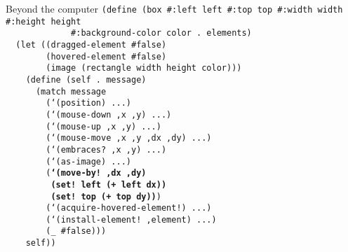 \begin{frame}{Beyond the computer}
  \tiny
  \texttt{(define (box \#:left left \#:top top \#:width width \#:height height\\
    \ \ \ \ \ \ \ \ \ \ \ \ \ \#:background-color color .\ elements)\\
    \ \ (let ((dragged-element \#false)\\
    \ \ \ \ \ \ \ \ (hovered-element \#false)\\
    \ \ \ \ \ \ \ \ (image (rectangle width height color)))\\
    \ \ \ \ (define (self .\ message)\\
    \ \ \ \ \ \ (match message\\
    \ \ \ \ \ \ \ \ (`(position) ...)\\
    \ \ \ \ \ \ \ \ (`(mouse-down ,x ,y) ...)\\
    \ \ \ \ \ \ \ \ (`(mouse-up ,x ,y) ...)\\
    \ \ \ \ \ \ \ \ (`(mouse-move ,x ,y ,dx ,dy) ...)\\
    \ \ \ \ \ \ \ \ (`(embraces?\ ,x ,y) ...)\\
    \ \ \ \ \ \ \ \ (`(as-image) ...)\\
    \ \ \ \ \ \ \ \ (\textbf{`(move-by!\ ,dx ,dy)\\
    \ \ \ \ \ \ \ \ \ (set!\ left (+ left dx))\\
    \ \ \ \ \ \ \ \ \ (set!\ top (+ top dy))})\\
    \ \ \ \ \ \ \ \ (`(acquire-hovered-element!) ...)\\
    \ \ \ \ \ \ \ \ (`(install-element!\ ,element) ...)\\
    \ \ \ \ \ \ \ \ (\_ \#false)))\\
    \ \ \ \ self))} \\
  \ \\ \ \\ \ \\ \ \\ \ \\ \ \\ \ \\ \ \\ \ 
\end{frame}

